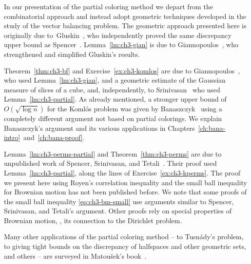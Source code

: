 In our presentation of the partial coloring method we depart from the
combinatorial approach and instead adopt geometric techniques
developed in the study of the vector balancing problem. The geometric
approach presented here is originally due to~Gluskin~\cite{Glu89}, who independently
proved the same discrepancy upper bound as
Spencer~\cite{spencer1985}. Lemma~\ref{lm:ch3-gian} is due to
Giannopoulos~\cite{Gia93}, who strengthened and simplified Gluskin's
results. 

Theorem~\ref{thm:ch3-bf} and Exercise~\ref{ex:ch3-komlos} are due to Giannopoulos~\cite{Gia93}, who
used Lemma~\ref{lm:ch3-gian}, and a geometric estimate of the Gaussian
measure of slices of a cube, and, independently, to
Srinivasan~\cite{Srinivasan97} who used Lemma~\ref{lm:ch3-partial}. As already mentioned, a stronger upper bound of
$O(\sqrt{\log n})$ for the Koml\'os problem was given by
Banaszczyk~\cite{Bana98} using a completely different argument not
based on partial colorings. We explain Banaszczyk's argument and its
various applications in
Chapters~\ref{ch:bana-intro}~and~\ref{ch:bana-proof}.

Lemma~\ref{lm:ch3-perms-partial} and Theorem~\ref{thm:ch3-perms} are
due to unpublished work of Spencer, Srinivasan, and
Tetali~\cite{SST-perms}. Their proof used Lemma~\ref{lm:ch3-partial},
along the lines of Exercise~\ref{ex:ch3-kperms}. The proof we present
here using Royen's correlation inequality and the small ball
inequality for Brownian motion has not been published before. We note
that some proofs of the small ball inequality \eqref{eq:ch3-bm-small}
use arguments similar to Spencer, Srinivasan, and Tetali's
argument. Other proofs rely on special properties of Brownian motion,
\eg, its connection to the Dirichlet problem.


Many other applications of the partial coloring method -- to
Tusn\'ady's problem, to giving tight bounds on the discrepancy of
halfspaces and other geometric sets, and others -- are surveyed in
Matou\v{s}ek's book~\cite{matousek2010geometric}.

